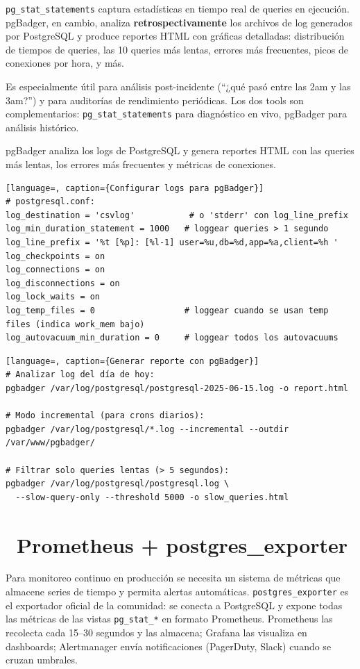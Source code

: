 \texttt{pg\_stat\_statements} captura estadísticas en tiempo real de queries en ejecución.
pgBadger, en cambio, analiza \textbf{retrospectivamente} los archivos de log generados por PostgreSQL y produce reportes HTML con gráficas detalladas: distribución de tiempos de queries, las 10 queries más lentas, errores más frecuentes, picos de conexiones por hora, y más.

Es especialmente útil para análisis post-incidente (``¿qué pasó entre las 2am y las 3am?'') y para auditorías de rendimiento periódicas.
Los dos tools son complementarios: \texttt{pg\_stat\_statements} para diagnóstico en vivo, pgBadger para análisis histórico.

pgBadger analiza los logs de PostgreSQL y genera reportes HTML con las queries más lentas, los errores más frecuentes y métricas de conexiones.

\begin{lstlisting}[language=, caption={Configurar logs para pgBadger}]
# postgresql.conf:
log_destination = 'csvlog'           # o 'stderr' con log_line_prefix
log_min_duration_statement = 1000   # loggear queries > 1 segundo
log_line_prefix = '%t [%p]: [%l-1] user=%u,db=%d,app=%a,client=%h '
log_checkpoints = on
log_connections = on
log_disconnections = on
log_lock_waits = on
log_temp_files = 0                  # loggear cuando se usan temp files (indica work_mem bajo)
log_autovacuum_min_duration = 0     # loggear todos los autovacuums
\end{lstlisting}

\begin{lstlisting}[language=, caption={Generar reporte con pgBadger}]
# Analizar log del día de hoy:
pgbadger /var/log/postgresql/postgresql-2025-06-15.log -o report.html

# Modo incremental (para crons diarios):
pgbadger /var/log/postgresql/*.log --incremental --outdir /var/www/pgbadger/

# Filtrar solo queries lentas (> 5 segundos):
pgbadger /var/log/postgresql/postgresql.log \
  --slow-query-only --threshold 5000 -o slow_queries.html
\end{lstlisting}

\section[Prometheus + postgres\_exporter]{~Prometheus + postgres\_exporter}

Para monitoreo continuo en producción se necesita un sistema de métricas que almacene series de tiempo y permita alertas automáticas.
\texttt{postgres\_exporter} es el exportador oficial de la comunidad: se conecta a PostgreSQL y expone todas las métricas de las vistas \texttt{pg\_stat\_*} en formato Prometheus.
Prometheus las recolecta cada 15--30 segundos y las almacena; Grafana las visualiza en dashboards; Alertmanager envía notificaciones (PagerDuty, Slack) cuando se cruzan umbrales.

